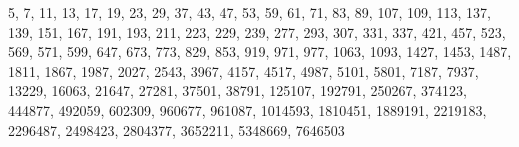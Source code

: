 5, 7, 11, 13, 17, 19, 23, 29, 37, 43, 47, 53, 59, 61, 71, 83, 89, 107, 109, 113, 137, 139, 151, 167, 191, 193, 211, 223, 229, 239, 277, 293, 307, 331, 337, 421, 457, 523, 569, 571, 599, 647, 673, 773, 829, 853, 919, 971, 977, 1063, 1093, 1427, 1453, 1487, 1811, 1867, 1987, 2027, 2543, 3967, 4157, 4517, 4987, 5101, 5801, 7187, 7937, 13229, 16063, 21647, 27281, 37501, 38791, 125107, 192791, 250267, 374123, 444877, 492059, 602309, 960677, 961087, 1014593, 1810451, 1889191, 2219183, 2296487, 2498423, 2804377, 3652211, 5348669, 7646503